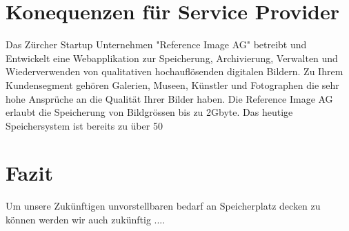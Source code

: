 \section{Konequenzen für Service Provider}
Das Zürcher Startup Unternehmen "Reference Image AG" betreibt und Entwickelt eine Webapplikation zur Speicherung, Archivierung, Verwalten und Wiederverwenden von qualitativen hochauflösenden digitalen Bildern. Zu Ihrem Kundensegment gehören Galerien, Museen, Künstler und Fotographen die sehr hohe Ansprüche an die Qualität Ihrer Bilder haben. Die Reference Image AG erlaubt die Speicherung von Bildgrössen bis zu 2Gbyte. Das heutige Speichersystem ist bereits zu über 50%

\section{Fazit}
Um unsere Zukünftigen unvorstellbaren bedarf an Speicherplatz decken zu können werden wir auch zukünftig ....

